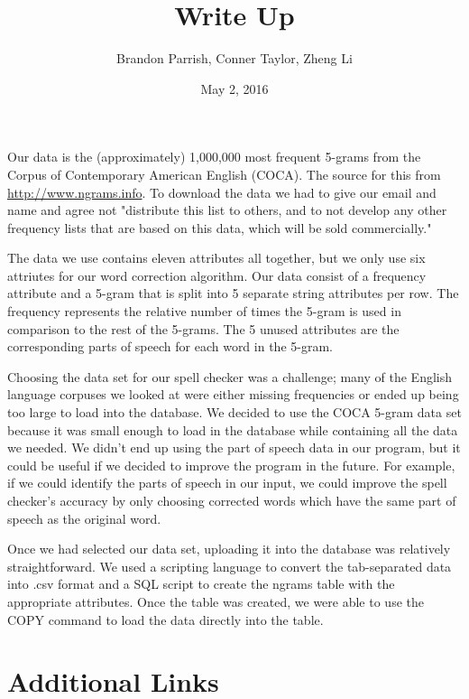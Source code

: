 \documentclass{article}
\title{Write Up}
\author{Brandon Parrish, Conner Taylor, Zheng Li}
\date{May 2, 2016}
\begin{document}
	\maketitle

	Our data is the (approximately) 1,000,000 most frequent 5-grams from the Corpus of Contemporary American English (COCA). The source for this from \url{http://www.ngrams.info}. To download the data we had to give our email and name and agree not "distribute this list to others, and to not develop any other frequency lists that are based on this data, which will be sold commercially."\vspace{5mm}

	The data we use contains eleven attributes all together, but we only use six attriutes for our word correction algorithm. Our data consist of a frequency attribute and a 5-gram that is split into 5 separate string attributes per row. The frequency represents the relative number of times the 5-gram is used in comparison to the rest of the 5-grams. The 5 unused attributes are the corresponding parts of speech for each word in the 5-gram.\vspace{5mm}

        Choosing the data set for our spell checker was a challenge; many of the English language corpuses we looked at were either missing frequencies or ended up being too large to load into the database. We decided to use the COCA 5-gram data set because it was small enough to load in the database while containing all the data we needed. We didn't end up using the part of speech data in our program, but it could be useful if we decided to improve the program in the future. For example, if we could identify the parts of speech in our input, we could improve the spell checker's accuracy by only choosing corrected words which have the same part of speech as the original word.\vspace{5mm}

        Once we had selected our data set, uploading it into the database was relatively straightforward. We used a scripting language to convert the tab-separated data into .csv format and a SQL script to create the ngrams table with the appropriate attributes. Once the table was created, we were able to use the COPY command to load the data directly into the table.

\newpage 
\section{Additional Links}
\end{document}
